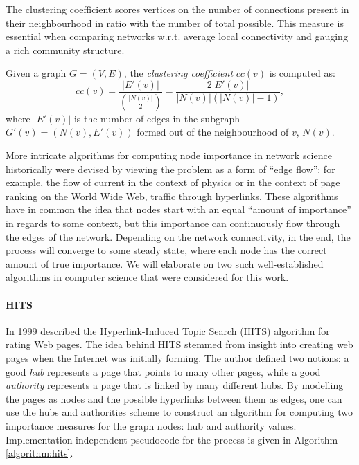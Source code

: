The clustering coefficient scores vertices on the number of connections present in their neighbourhood in ratio with the number of total possible. This measure is essential when comparing networks w.r.t. average local connectivity and gauging a rich community structure.

\begin{definition}
Given a graph $G=(V, E)$, the \emph{clustering coefficient} $cc(v)$ is computed as: \begin{equation}
cc(v)=\frac{|E'(v)|}{{|N(v)| \choose 2}} = \frac{2|E'(v)|}{|N(v)|(|N(v)|-1)},\end{equation}
where $|E'(v)|$ is the number of edges in the subgraph $G'(v)=(N(v), E'(v))$ formed out of the neighbourhood of $v$, $N(v)$.
\end{definition}

More intricate algorithms for computing node importance in network science historically were devised by viewing the problem as a form of \enquote{edge flow}: for example, the flow of current in the context of physics or in the context of page ranking on the World Wide Web, traffic through hyperlinks. These algorithms have in common the idea that nodes start with an equal \enquote{amount of importance} in regards to some context, but this importance can continuously flow through the edges of the network. Depending on the network connectivity, in the end, the process will converge to some steady state, where each node has the correct amount of true importance. We will elaborate on two such well-established algorithms in computer science that were considered for this work.

\paragraph{HITS} In 1999 \cite{kleinberg_authoritative_1999} described the Hyperlink-Induced Topic Search (HITS) algorithm for rating Web pages. The idea behind HITS stemmed from insight into creating web pages when the Internet was initially forming. The author defined two notions: a good \emph{hub} represents a page that points to many other pages, while a good \emph{authority} represents a page that is linked by many different hubs. By modelling the pages as nodes and the possible hyperlinks between them as edges, one can use the hubs and authorities scheme to construct an algorithm for computing two importance measures for the graph nodes: hub and authority values. Implementation-independent pseudocode for the process is given in Algorithm \ref{algorithm:hits}.

